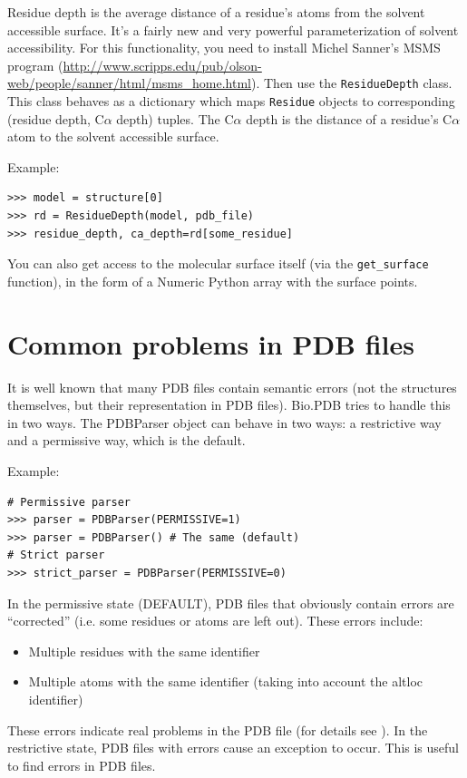 \documentclass{report}
\begin{document}
Residue depth is the average distance of a residue's atoms from the
solvent accessible surface. It's a fairly new and very powerful parameterization
of solvent accessibility. For this functionality, you need to install
Michel Sanner's MSMS program (\url{http://www.scripps.edu/pub/olson-web/people/sanner/html/msms_home.html}).
Then use the \texttt{ResidueDepth} class. This class behaves as a
dictionary which maps \texttt{Residue} objects to corresponding (residue
depth, C$\alpha$ depth) tuples. The C$\alpha$ depth is the distance
of a residue's C$\alpha$ atom to the solvent accessible surface. 

Example:

\begin{verbatim}
>>> model = structure[0]
>>> rd = ResidueDepth(model, pdb_file)
>>> residue_depth, ca_depth=rd[some_residue]
\end{verbatim}
You can also get access to the molecular surface itself (via the \texttt{get\_surface}
function), in the form of a Numeric Python array with the surface points.

\section{Common problems in PDB files}

It is well known that many PDB files contain semantic errors (not the
structures themselves, but their representation in PDB files).
Bio.PDB tries to handle this in two ways. The PDBParser
object can behave in two ways: a restrictive way and a permissive
way, which is the default.

Example:

\begin{verbatim}
# Permissive parser
>>> parser = PDBParser(PERMISSIVE=1)
>>> parser = PDBParser() # The same (default)
# Strict parser
>>> strict_parser = PDBParser(PERMISSIVE=0)
\end{verbatim}
In the permissive state (DEFAULT), PDB files that obviously contain
errors are ``corrected'' (i.e. some residues or atoms are left out).
These errors include:

\begin{itemize}
\item Multiple residues with the same identifier
\item Multiple atoms with the same identifier (taking into account the altloc
identifier)
\end{itemize}
These errors indicate real problems in the PDB file (for details see
\cite[Hamelryck and Manderick, 2003]{hamelryck2003a}). In the restrictive state, PDB files with errors cause an exception to occur. This is useful to find errors in PDB files.
\end{document}
